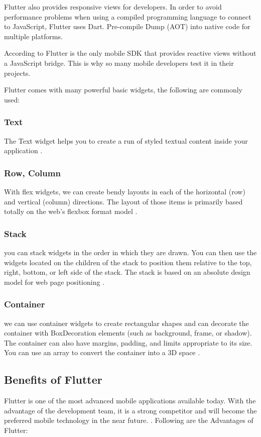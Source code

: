 Flutter also provides responsive views for developers. In order to avoid performance problems when using a compiled programming language to connect to JavaScript, Flutter uses Dart. Pre-compile Dump (AOT) into native code for multiple platforms.

According to \cite{WhatisFlutter-Benefits:online} Flutter is the only mobile SDK that provides reactive views without a JavaScript bridge. This is why so many mobile developers test it in their projects.

Flutter comes with many powerful basic widgets, the following are commonly used:

\subsubsection{Text}
The Text widget helps you to create a run of styled textual content inside your application \cite{widgetsFlutterDev:online}.
\subsubsection{Row, Column}
With flex widgets, we can create bendy layouts in each of the horizontal (row) and vertical (column) directions. The layout of those items is primarily based totally on the web’s flexbox format model \cite{widgetsFlutterDev:online}.
\subsubsection{Stack}
you can stack widgets in the order in which they are drawn. You can then use the widgets located on the children of the stack to position them relative to the top, right, bottom, or left side of the stack. The stack is based on an absolute design model for web page positioning \cite{widgetsFlutterDev:online}.
\subsubsection{Container}
we can use container widgets to create rectangular shapes and can decorate the container with BoxDecoration elements (such as background, frame, or shadow). The container can also have margins, padding, and limits appropriate to its size. You can use an array to convert the container into a 3D space \cite{widgetsFlutterDev:online}.

\subsection{Benefits of Flutter}
Flutter is one of the most advanced mobile applications available today. With the advantage of the development team, it is a strong competitor and will become the preferred mobile technology in the near future. \cite{WhatisFlutter-Benefits:online}. Following are the Advantages of Flutter:
